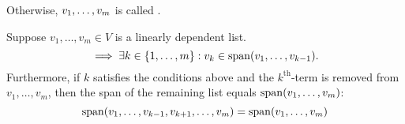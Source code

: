 \begin{mydef} 
  Otherwise, $v_1, \dots, v_m$ is called .
\end{mydef}




\setcounter{thm}{18}
\begin{thm} 
  \label{thm: linear dependence lemma}
  Suppose $v_{1}, \dots, v_{m}\in V$ is a linearly dependent list.
  \begin{equation}
    \implies \exists k \in \{ 1, \dots, m \} : v_k \in \operatorname{span} (v_1, \dots, v_{k-1}).
  \end{equation}
  Furthermore, if $k$ satisfies the conditions above and the $k^{\text{th}}$-term is removed from $v_1, \dots, v_m$, then the span of the remaining list equals $\operatorname{span} (v_1, \dots, v_{m})$:
  \begin{equation}
    \operatorname{span} (v_1, \dots, v_{k-1}, v_{k+1}, \dots, v_m) = \operatorname{span} (v_1, \dots, v_m)
  \end{equation}
\end{thm}
